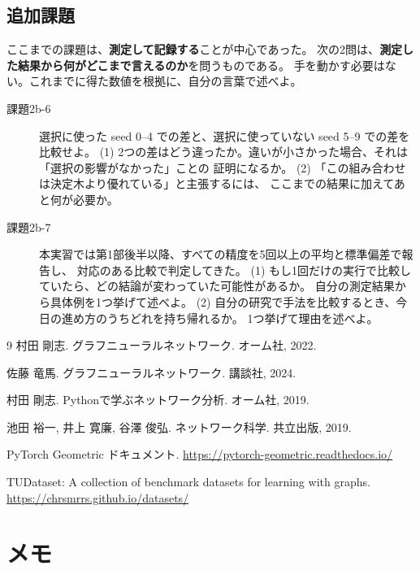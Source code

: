 \documentclass[11pt,a4paper]{jsarticle}
\begin{document}
\subsection*{追加課題}

ここまでの課題は、\textbf{測定して記録する}ことが中心であった。
次の2問は、\textbf{測定した結果から何がどこまで言えるのか}を問うものである。
手を動かす必要はない。これまでに得た数値を根拠に、自分の言葉で述べよ。

\begin{description}
\item[課題2b-6] 選択に使った seed 0--4 での差と、選択に使っていない seed 5--9 での差を比較せよ。
  (1) 2つの差はどう違ったか。違いが小さかった場合、それは「選択の影響がなかった」ことの
  証明になるか。
  (2) 「この組み合わせは決定木より優れている」と主張するには、
  ここまでの結果に加えてあと何が必要か。

\item[課題2b-7] 本実習では第1部後半以降、すべての精度を5回以上の平均と標準偏差で報告し、
  対応のある比較で判定してきた。
  (1) もし1回だけの実行で比較していたら、どの結論が変わっていた可能性があるか。
  自分の測定結果から具体例を1つ挙げて述べよ。
  (2) 自分の研究で手法を比較するとき、今日の進め方のうちどれを持ち帰れるか。
  1つ挙げて理由を述べよ。
\end{description}

\begin{thebibliography}{9}
村田 剛志.
\newblock グラフニューラルネットワーク.
\newblock オーム社, 2022.

佐藤 竜馬.
\newblock グラフニューラルネットワーク.
\newblock 講談社, 2024.

村田 剛志.
\newblock Pythonで学ぶネットワーク分析.
\newblock オーム社, 2019.

池田 裕一, 井上 寛廉, 谷澤 俊弘.
\newblock ネットワーク科学.
\newblock 共立出版, 2019.

PyTorch Geometric ドキュメント.
\newblock \url{https://pytorch-geometric.readthedocs.io/}

TUDataset: A collection of benchmark datasets for learning with graphs.
\newblock \url{https://chrsmrrs.github.io/datasets/}
\end{thebibliography}

\newpage
\section*{メモ}
\end{document}
